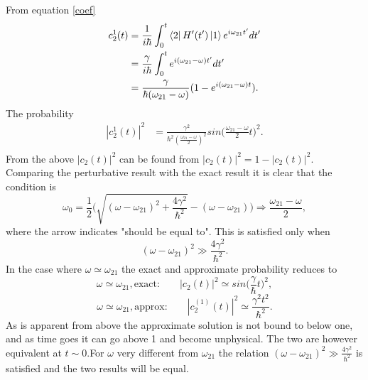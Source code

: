 \begin{example}
\begin{enumerate}
		From equation \eqref{coef}
		\begin{equation}
			\begin{split}
				c^1_{2}(t)&=\frac{1}{i\hbar}\int_{0}^{t}\bra{2}H'(t')\ket{1}e^{i\omega_{21}t'}dt'\\
				&=\frac{\gamma}{i\hbar}\int_{0}^{t} e^{i(\omega_{21}-\omega )t'}dt'\\
				&=\frac{\gamma}{\hbar (\omega_{21}-\omega )}(1-e^{i(\omega_{21}-\omega )t}).\\
			\end{split}
		\end{equation} 
		The probability
		\begin{equation}
			\begin{split}
				|c^1_{2}(t)|^2&=\frac{\gamma^2}{\hbar^2 (\frac{\omega_{21}-\omega }{2})^2}sin\bigg(\frac{\omega_{21}-\omega}{2}t\bigg)^2.\\
			\end{split}
		\end{equation} 
		From the above $|c_2(t)|^2$ can be found from $|c_2(t)|^2=1-|c_2(t)|^2$. Comparing the perturbative result with the exact result it is clear that the condition is
		\begin{equation}
			\omega_0=\frac{1}{2}\bigg(\sqrt{(\omega-\omega_{21})^2+\frac{4\gamma^2}{\hbar^2}}-(\omega-\omega_{21})\bigg) \Rightarrow \frac{\omega_{21}-\omega}{2},
		\end{equation} 
		where the arrow indicates "should be equal to". This is satisfied only when
		\begin{equation}
			(\omega-\omega_{21})^2\gg\frac{4\gamma^2}{\hbar^2}.
		\end{equation} 
		In the case where $\omega\simeq\omega_{21}$ the exact and approximate probability reduces to
		\begin{equation}
			\omega\simeq\omega_{21}, \mbox{exact:} \qquad |c_2(t)|^2\simeq sin\bigg(\frac{\gamma}{\hbar}t\bigg)^2,
		\end{equation} 
		\begin{equation}
			\omega\simeq\omega_{21}, \mbox{approx:} \qquad |c^{(1)}_2(t)|^2\simeq \frac{\gamma^2t^2}{\hbar^2}.
		\end{equation} 
		As is apparent from above the approximate solution is not bound to below one, and as time goes it can go above 1 and become unphysical. The two are however equivalent at $t\sim 0$.\newline For $\omega$ very different from $\omega_{21}$ the relation $(\omega-\omega_{21})^2\gg\frac{4\gamma^2}{\hbar^2}$ is satisfied and the two results will be equal.
		
	\end{enumerate}
\end{example}

